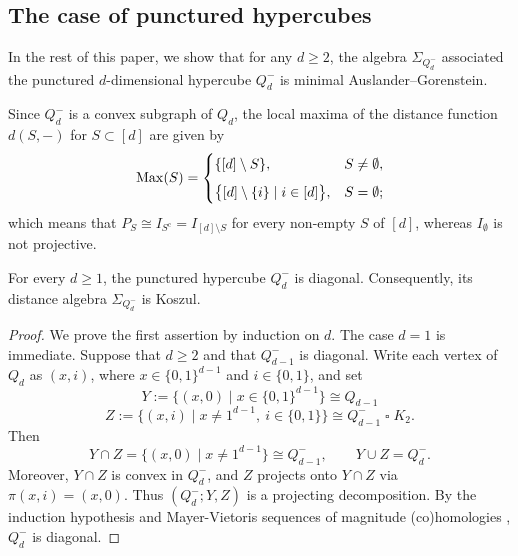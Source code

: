 \documentclass[a4paper,leqno]{amsart}
\begin{document}


\subsection{The case of punctured hypercubes}\label{sec:ex-2-IG}

In the rest of this paper, we show that for any $d\ge 2$, the algebra $\Sigma_{Q_d^-}$ associated the punctured $d$-dimensional hypercube $Q_d^{-}$ is minimal Auslander--Gorenstein.

Since $Q_d^-$ is a convex subgraph of $Q_d$, the local maxima of the distance function \(d(S,-)\) for $S\subset[d]$ are given by
\[
\operatorname{Max}(S)=
\begin{cases}
\{[d]\setminus S\}, & S\neq\emptyset,\\[2mm]
\bigl\{[d]\setminus\{i\}\mid i\in[d]\bigr\},
& S=\emptyset;
\end{cases}
\]
which means that $P_S \cong I_{S^{\mathrm{c}}} = I_{[d]\setminus S}$ for every non-empty $S$ of $[d]$, whereas \(I_{\emptyset}\) is not projective.

\begin{prop}\label{prop:punctured-cube-koszul}
For every $d\geq 1$, the punctured hypercube $Q_d^{-}$ is diagonal.
Consequently, its distance algebra $\Sigma_{Q_d^{-}}$ is Koszul.
\end{prop}

\begin{proof}
We prove the first assertion by induction on $d$. The case $d=1$ is
immediate. Suppose that $d\geq 2$ and that $Q_{d-1}^{-}$ is diagonal.
Write each vertex of $Q_d$ as $(x,i)$, where
$x\in\{0,1\}^{d-1}$ and $i\in\{0,1\}$, and set
\[
Y:=\{(x,0)\mid x\in\{0,1\}^{d-1}\}\cong Q_{d-1}
\]
\[
Z:=\{(x,i)\mid x\neq 1^{d-1},\ i\in\{0,1\}\}
\cong Q_{d-1}^{-}\mathbin{\square}K_2.
\]
Then
\[
Y\cap Z
=\{(x,0)\mid x\neq 1^{d-1}\}
\cong Q_{d-1}^{-},
\qquad
Y\cup Z=Q_d^{-}.
\]
Moreover, $Y\cap Z$ is convex in $Q_d^{-}$, and $Z$ projects onto
$Y\cap Z$ via $\pi(x,i)=(x,0)$. Thus $(Q_d^{-};Y,Z)$ is a projecting decomposition. By the induction hypothesis and Mayer-Vietoris sequences of magnitude (co)homologies \cite[Theorem~6.6]{HW17}, $Q_{d}^{-}$ is diagonal.
\end{proof}
\end{document}
